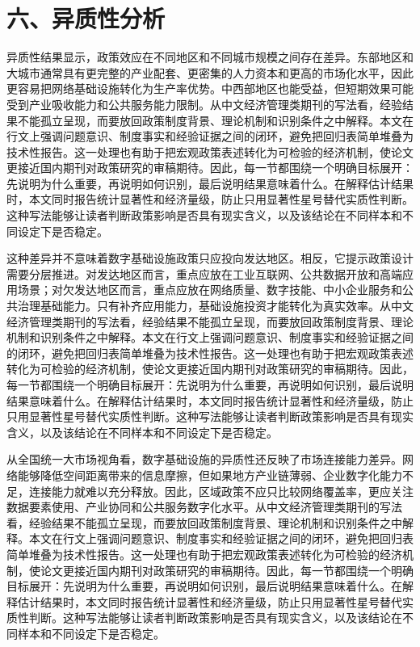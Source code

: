 \documentclass[12pt,a4paper]{article}
\begin{document}
\section*{六、异质性分析}
异质性结果显示，政策效应在不同地区和不同城市规模之间存在差异。东部地区和大城市通常具有更完整的产业配套、更密集的人力资本和更高的市场化水平，因此更容易把网络基础设施转化为生产率优势。中西部地区也能受益，但短期效果可能受到产业吸收能力和公共服务能力限制。从中文经济管理类期刊的写法看，经验结果不能孤立呈现，而要放回政策制度背景、理论机制和识别条件之中解释。本文在行文上强调问题意识、制度事实和经验证据之间的闭环，避免把回归表简单堆叠为技术性报告。这一处理也有助于把宏观政策表述转化为可检验的经济机制，使论文更接近国内期刊对政策研究的审稿期待。因此，每一节都围绕一个明确目标展开：先说明为什么重要，再说明如何识别，最后说明结果意味着什么。在解释估计结果时，本文同时报告统计显著性和经济量级，防止只用显著性星号替代实质性判断。这种写法能够让读者判断政策影响是否具有现实含义，以及该结论在不同样本和不同设定下是否稳定。

这种差异并不意味着数字基础设施政策只应投向发达地区。相反，它提示政策设计需要分层推进。对发达地区而言，重点应放在工业互联网、公共数据开放和高端应用场景；对欠发达地区而言，重点应放在网络质量、数字技能、中小企业服务和公共治理基础能力。只有补齐应用能力，基础设施投资才能转化为真实效率。从中文经济管理类期刊的写法看，经验结果不能孤立呈现，而要放回政策制度背景、理论机制和识别条件之中解释。本文在行文上强调问题意识、制度事实和经验证据之间的闭环，避免把回归表简单堆叠为技术性报告。这一处理也有助于把宏观政策表述转化为可检验的经济机制，使论文更接近国内期刊对政策研究的审稿期待。因此，每一节都围绕一个明确目标展开：先说明为什么重要，再说明如何识别，最后说明结果意味着什么。在解释估计结果时，本文同时报告统计显著性和经济量级，防止只用显著性星号替代实质性判断。这种写法能够让读者判断政策影响是否具有现实含义，以及该结论在不同样本和不同设定下是否稳定。

从全国统一大市场视角看，数字基础设施的异质性还反映了市场连接能力差异。网络能够降低空间距离带来的信息摩擦，但如果地方产业链薄弱、企业数字化能力不足，连接能力就难以充分释放。因此，区域政策不应只比较网络覆盖率，更应关注数据要素使用、产业协同和公共服务数字化水平。从中文经济管理类期刊的写法看，经验结果不能孤立呈现，而要放回政策制度背景、理论机制和识别条件之中解释。本文在行文上强调问题意识、制度事实和经验证据之间的闭环，避免把回归表简单堆叠为技术性报告。这一处理也有助于把宏观政策表述转化为可检验的经济机制，使论文更接近国内期刊对政策研究的审稿期待。因此，每一节都围绕一个明确目标展开：先说明为什么重要，再说明如何识别，最后说明结果意味着什么。在解释估计结果时，本文同时报告统计显著性和经济量级，防止只用显著性星号替代实质性判断。这种写法能够让读者判断政策影响是否具有现实含义，以及该结论在不同样本和不同设定下是否稳定。
\end{document}

